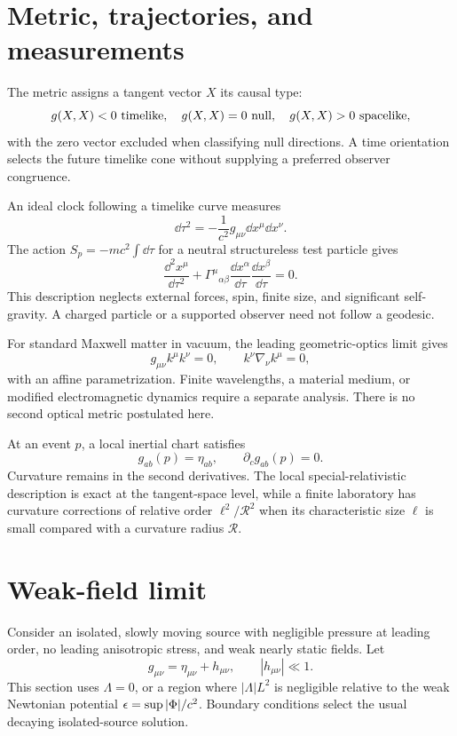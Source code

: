 \documentclass[11pt]{article}
\begin{document}
\section{Metric, trajectories, and measurements}
The metric assigns a tangent vector $X$ its causal type:
\begin{equation}
g(X,X)<0\ \hbox{timelike},\quad
g(X,X)=0\ \hbox{null},\quad
g(X,X)>0\ \hbox{spacelike},
\label{eq:causalclassification}
\end{equation}
with the zero vector excluded when classifying null directions. A time orientation selects the future timelike cone without supplying a preferred observer congruence.

An ideal clock following a timelike curve measures
\begin{equation}
\dd\tau^2=-\frac{1}{c^2}g_{\mu\nu}\dd x^\mu\dd x^\nu.
\label{eq:propertime}
\end{equation}
The action $S_p=-mc^2\int\dd\tau$ for a neutral structureless test particle gives
\begin{equation}
\frac{\dd^2x^\mu}{\dd\tau^2}+\Gamma^\mu{}_{\alpha\beta}
\frac{\dd x^\alpha}{\dd\tau}\frac{\dd x^\beta}{\dd\tau}=0.
\label{eq:geodesic}
\end{equation}
This description neglects external forces, spin, finite size, and significant self-gravity. A charged particle or a supported observer need not follow a geodesic.

For standard Maxwell matter in vacuum, the leading geometric-optics limit gives
\begin{equation}
g_{\mu\nu}k^\mu k^\nu=0,\qquad k^\nu\nabla_\nu k^\mu=0,
\label{eq:null}
\end{equation}
with an affine parametrization. Finite wavelengths, a material medium, or modified electromagnetic dynamics require a separate analysis. There is no second optical metric postulated here.

At an event $p$, a local inertial chart satisfies
\begin{equation}
g_{ab}(p)=\eta_{ab},\qquad \partial_cg_{ab}(p)=0.
\label{eq:localinertial}
\end{equation}
Curvature remains in the second derivatives. The local special-relativistic description is exact at the tangent-space level, while a finite laboratory has curvature corrections of relative order $\ell^2/\mathcal R^2$ when its characteristic size $\ell$ is small compared with a curvature radius $\mathcal R$.

\section{Weak-field limit}
Consider an isolated, slowly moving source with negligible pressure at leading order, no leading anisotropic stress, and weak nearly static fields. Let
\begin{equation}
g_{\mu\nu}=\eta_{\mu\nu}+h_{\mu\nu},\qquad |h_{\mu\nu}|\ll1.
\label{eq:linearizedmetric}
\end{equation}
This section uses $\Lambda=0$, or a region where $|\Lambda|L^2$ is negligible relative to the weak Newtonian potential $\epsilon=\sup|\Phi|/c^2$. Boundary conditions select the usual decaying isolated-source solution.
\end{document}
